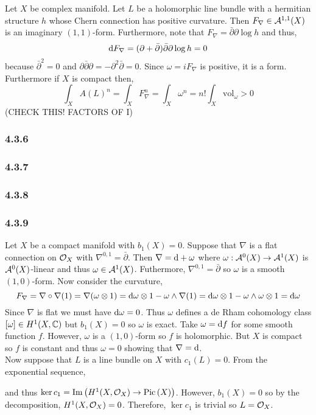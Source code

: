 \documentclass[12pt]{article}
\begin{document}
Let $X$ be complex manifold. Let $L$ be a holomorphic line bundle with a hermitian structure $h$ whose Chern connection has positive curvature. Then $F_\nabla \in \mathcal{A}^{1,1}(X)$ is an imaginary $(1,1)$-form. Furthermore, note that $F_\nabla = \bar{\partial} \partial \log{h}$ and thus,
\[ \mathrm{d}{F_\nabla} = (\partial + \bar{\partial}) \bar{\partial} \partial \log{h} = 0 \]
because $\bar{\partial}^2 = 0$ and $\partial \bar{\partial} \partial = - \partial^2 \bar{\partial} = 0$. Since $\omega = i F_\nabla$ is positive, it is a \kahler form. Furthermore if $X$ is compact then,
\[ \int_X A(L)^n = \int_X F_\nabla^n = \int_X \omega^n = n! \int_X \mathrm{vol}_\omega > 0 \]
(CHECK THIS! FACTORS OF I)

\subsubsection{4.3.6}

\subsubsection{4.3.7}

\subsubsection{4.3.8}

\subsubsection{4.3.9}

Let $X$ be a compact \kahler manifold with $b_1(X) = 0$. Suppose that $\nabla$ is a flat connection on $\mathcal{O}_{X}$ with $\nabla^{0,1} = \bar{\partial}$. Then $\nabla = \mathrm{d} + \omega$ where $\omega : \mathcal{A}^0(X) \to \mathcal{A}^1(X)$ is $\mathcal{A}^0(X)$-linear and thus $\omega \in \mathcal{A}^1(X)$. Futhermore, $\nabla^{0,1} = \bar{\partial}$ so $\omega$ is a smooth $(1,0)$-form. Now consider the curvature,
\[ F_\nabla = \nabla \circ \nabla(1) = \nabla (\omega \otimes 1) = \mathrm{d}{\omega} \otimes 1 - \omega \wedge \nabla(1) = \mathrm{d}{\omega} \otimes 1 - \omega \wedge \omega \otimes 1 = \mathrm{d}{\omega} \]
Since $\nabla$ is flat we must have $\mathrm{d}{\omega} = 0$. Thus $\omega$ defines a de Rham cohomology class $[\omega] \in H^1(X, \mathbb{C})$ but $b_1(X) = 0$ so $\omega$ is exact. Take $\omega = \mathrm{d}{f}$ for some smooth function $f$. However, $\omega$ is a $(1,0)$-form so $f$ is holomorphic. But $X$ is compact so $f$ is constant and thus $\omega = 0$ showing that $\nabla = \mathrm{d}$.
\bigskip\\
Now suppose that $L$ is a line bundle on $X$ with $c_1(L) = 0$. From the exponential sequence,
\begin{center}
\end{center}
and thus $\ker{c_1} = \mathrm{Im}\left( H^1(X, \mathcal{O}_{X}) \to \mathrm{Pic} \left( X \right) \right)$. However, $b_1(X) = 0$ so by the \kahler decomposition, $H^1(X, \mathcal{O}_{X}) = 0$. Therefore, $\ker{c_1}$ is trivial so $L = \mathcal{O}_{X}$.
\end{document}
